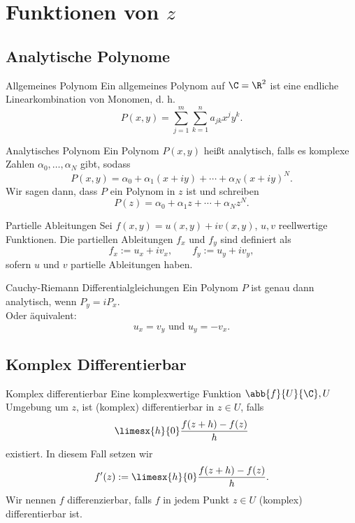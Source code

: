 \section{Funktionen von \(z\)}

\subsection{Analytische Polynome}

\begin{karte}{Allgemeines Polynom}
    Ein allgemeines Polynom auf \(\C = \R^2\) 
    ist eine endliche Linearkombination von Monomen, d. h. 
    \[ P(x,y) = \sum_{j=1}^m \sum_{k=1}^n a_{jk} x^j y^k. \]
\end{karte}

\begin{karte}{Analytisches Polynom}
    Ein Polynom \(P(x,y)\) heißt analytisch, falls es komplexe Zahlen 
    \( \alpha_0, \ldots, \alpha_N \) gibt, sodass 
    \[ P(x,y) = \alpha_0 + \alpha_1 (x+iy) + \cdots + \alpha_N (x+iy)^N. \]
    Wir sagen dann, dass \(P\) ein Polynom in \(z\) ist und schreiben 
    \[ P(z) = \alpha_0 + \alpha_1 z + \cdots + \alpha_N z^N. \]
\end{karte}

\begin{karte}{Partielle Ableitungen}
    Sei \( f(x,y) = u(x,y) + iv(x,y) \), \(u,v\) reellwertige Funktionen. 
    Die partiellen Ableitungen \(f_x\) und \(f_y\) sind definiert als 
    \[ f_x := u_x + i v_x, \qquad f_y := u_y + i v_y, \]
    sofern \(u\) und \(v\) partielle Ableitungen haben. 
\end{karte}

\begin{karte}{Cauchy-Riemann Differentialgleichungen}
    Ein Polynom \(P\) ist genau dann analytisch, wenn \(P_y = i P_x\).\\
    Oder äquivalent: 
    \[ u_x = v_y \text{ und } u_y = -v_x. \]
\end{karte}

\subsection{Komplex Differentierbar}

\begin{karte}{Komplex differentierbar}
    Eine komplexwertige Funktion \(\abb{f}{U}{\C}, U\) Umgebung um \(z\), 
    ist (komplex) differentierbar in \(z\in U\), falls 
    \[ \limesx{h}{0} \frac{f(z+h) - f(z)}{h} \] existiert. 
    In diesem Fall setzen wir 
    \[ f'(z) := \limesx{h}{0} \frac{f(z+h) - f(z)}{h}. \]
    Wir nennen \(f\) differenzierbar, falls \(f\) in jedem Punkt \(z\in U\) (komplex) 
    differentierbar ist.
\end{karte}